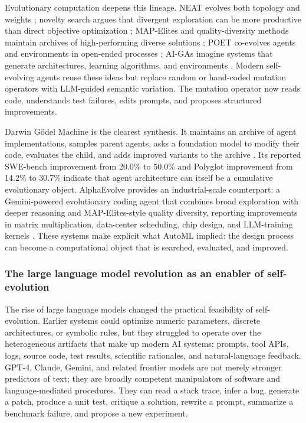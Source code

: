 Evolutionary computation deepens this lineage. NEAT evolves both topology and weights \cite{stanley2002evolving}; novelty search argues that divergent exploration can be more productive than direct objective optimization \cite{lehman2011abandoning}; MAP-Elites and quality-diversity methods maintain archives of high-performing diverse solutions \cite{mouret2015illuminating}; POET co-evolves agents and environments in open-ended processes \cite{wang2019poet}; AI-GAs imagine systems that generate architectures, learning algorithms, and environments \cite{clune2019ai}. Modern self-evolving agents reuse these ideas but replace random or hand-coded mutation operators with LLM-guided semantic variation. The mutation operator now reads code, understands test failures, edits prompts, and proposes structured improvements.

Darwin G{\"o}del Machine is the clearest synthesis. It maintains an archive of agent implementations, samples parent agents, asks a foundation model to modify their code, evaluates the child, and adds improved variants to the archive \cite{darwingodelmachine2025}. Its reported SWE-bench improvement from 20.0\% to 50.0\% and Polyglot improvement from 14.2\% to 30.7\% indicate that agent architecture can itself be a cumulative evolutionary object. AlphaEvolve provides an industrial-scale counterpart: a Gemini-powered evolutionary coding agent that combines broad exploration with deeper reasoning and MAP-Elites-style quality diversity, reporting improvements in matrix multiplication, data-center scheduling, chip design, and LLM-training kernels \cite{alphaevolve2025}. These systems make explicit what AutoML implied: the design process can become a computational object that is searched, evaluated, and improved.

\subsubsection{The large language model revolution as an enabler of self-evolution}

The rise of large language models changed the practical feasibility of self-evolution. Earlier systems could optimize numeric parameters, discrete architectures, or symbolic rules, but they struggled to operate over the heterogeneous artifacts that make up modern AI systems: prompts, tool APIs, logs, source code, test results, scientific rationales, and natural-language feedback. GPT-4, Claude, Gemini, and related frontier models are not merely stronger predictors of text; they are broadly competent manipulators of software and language-mediated procedures. They can read a stack trace, infer a bug, generate a patch, produce a unit test, critique a solution, rewrite a prompt, summarize a benchmark failure, and propose a new experiment.

